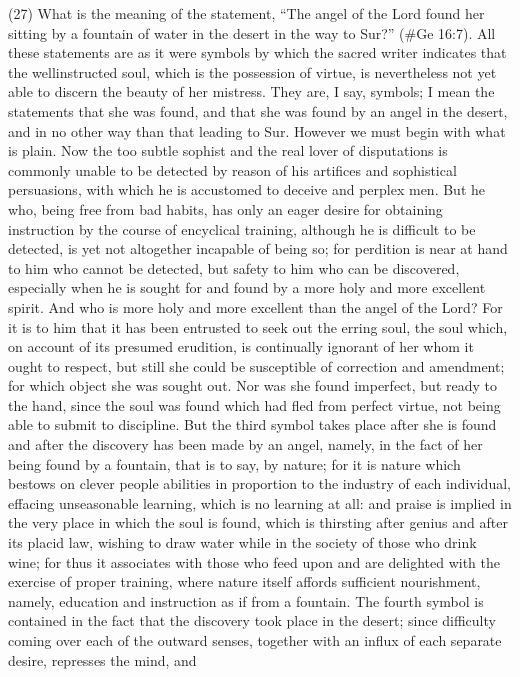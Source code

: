 (27) What is the meaning of the statement, ``The angel of the Lord found her sitting by a fountain of
water in the desert in the way to Sur?'' (\#Ge 16:7). All these statements are as it were symbols
by which the sacred writer indicates that the wellinstructed soul, which is the possession of virtue,
is nevertheless not yet able to discern the beauty of her mistress. They are, I say, symbols; I mean
the statements that she was found, and that she was found by an angel in the desert, and in no
other way than that leading to Sur. However we must begin with what is plain. Now the too subtle
sophist and the real lover of disputations is commonly unable to be detected by reason of his
artifices and sophistical persuasions, with which he is accustomed to deceive and perplex men.
But he who, being free from bad habits, has only an eager desire for obtaining instruction by the
course of encyclical training, although he is difficult to be detected, is yet not altogether incapable
of being so; for perdition is near at hand to him who cannot be detected, but safety to him who can
be discovered, especially when he is sought for and found by a more holy and more excellent spirit.
And who is more holy and more excellent than the angel of the Lord? For it is to him that it has
been entrusted to seek out the erring soul, the soul which, on account of its presumed erudition, is
continually ignorant of her whom it ought to respect, but still she could be susceptible of correction
and amendment; for which object she was sought out. Nor was she found imperfect, but ready to
the hand, since the soul was found which had fled from perfect virtue, not being able to submit to
discipline. But the third symbol takes place after she is found and after the discovery has been
made by an angel, namely, in the fact of her being found by a fountain, that is to say, by nature; for
it is nature which bestows on clever people abilities in proportion to the industry of each individual,
effacing unseasonable learning, which is no learning at all: and praise is implied in the very place in
which the soul is found, which is thirsting after genius and after its placid law, wishing to draw water
while in the society of those who drink wine; for thus it associates with those who feed upon and
are delighted with the exercise of proper training, where nature itself affords sufficient
nourishment, namely, education and instruction as if from a fountain. The fourth symbol is
contained in the fact that the discovery took place in the desert; since difficulty coming over each
of the outward senses, together with an influx of each separate desire, represses the mind, and
